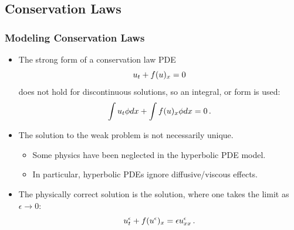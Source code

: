 \subsection{Conservation Laws}
\begin{frame}
\frametitle{Modeling Conservation Laws}

\begin{itemize}
  \item The strong form of a conservation law PDE
    \begin{equation}
      u_t + f(u)_x
      = 0
    \end{equation}
    does not hold for discontinuous solutions, so an integral, or  form
    is used:
    \begin{equation}
      \int u_t\phi dx
        + \int f(u)_x\phi dx
      = 0 \,.
    \end{equation}
  \item The solution to the weak problem is not necessarily unique.
    \begin{itemize}
      \item Some physics have been neglected in the hyperbolic PDE model.
      \item In particular, hyperbolic PDEs ignore diffusive/viscous effects.
    \end{itemize}
  \item The physically correct solution is the 
    solution, where one takes the limit as $\epsilon\rightarrow0$:
    \begin{equation}
      u^\epsilon_t
        + f(u^\epsilon)_x
      = \epsilon u_{xx}^\epsilon \,.
    \end{equation}
\end{itemize}

\end{frame}
